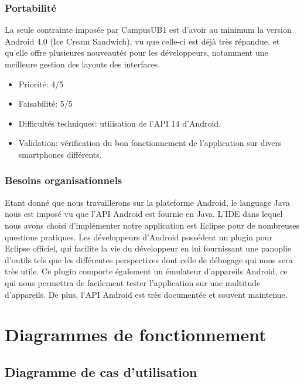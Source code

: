 \documentclass [pdftex,12pt] {report}
\begin{document}
\subsection{Portabilité}
La seule contrainte imposée par CampusUB1 est d'avoir au minimum la version Android 4.0 (Ice Cream Sandwich), vu que celle-ci est déjà très répandue, et qu'elle offre plusieures nouveautés pour les développeurs, notamment une meilleure gestion des layouts des interfaces.

\begin{itemize}
\renewcommand{\labelitemi}{$\bullet$}
\item Priorité: 4/5
\item Faisabilité: 5/5
\item Difficultés techniques: utilisation de l'API 14 d'Android.
\item Validation: vérification du bon fonctionnement de l'application sur divers smartphones différents.
\end{itemize} 

\subsection{Besoins organisationnels}
Etant donné que nous travaillerons sur la plateforme Android, le language Java nous est imposé vu que l'API Android est fournie en Java.
L'IDE dans lequel nous avons choisi d'implémenter notre application est Eclipse pour de nombreuses questions pratiques. Les développeurs d'Android possédent un plugin pour Eclipse officiel, qui facilite la vie du développeur en lui fournissant une panoplie d'outils tels que les différentes perspectives dont celle de débogage qui nous sera très utile. Ce plugin comporte également un émulateur d'appareils Android, ce qui nous permettra de facilement tester l'application sur une multitude d'appareils. De plus, l'API Android est très documentée et souvent maintenue.



\chapter{Diagrammes de fonctionnement}

\section{Diagramme de cas d'utilisation}
\end{document}
